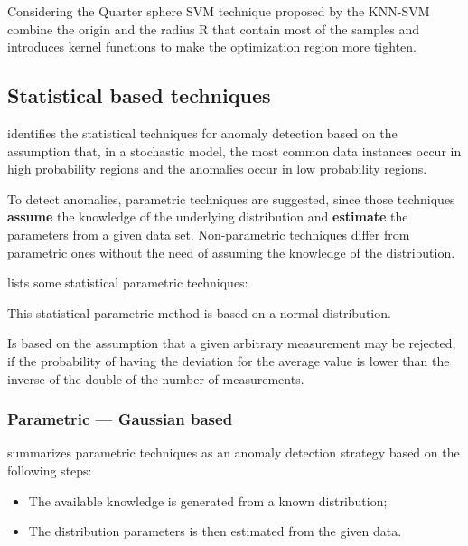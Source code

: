 Considering the Quarter sphere SVM technique proposed by \cite{class:rajasegarar:2007} the KNN-SVM combine the origin and the radius R that contain most of the samples and introduces kernel functions to make the optimization region more tighten. 

\subsection{Statistical based techniques}
\label{sec:statbased}



\cite{gen:chandola:2009} identifies the statistical techniques for anomaly detection based on the assumption that, in a stochastic model, the most common data instances occur in high probability regions and the anomalies occur in low probability regions.

To detect anomalies, parametric techniques are suggested, since those techniques \textbf{assume} the knowledge of the underlying distribution and \textbf{estimate} the parameters from a given data set. Non-parametric techniques differ from parametric ones without the need of assuming the knowledge of the distribution.

\cite{cluster:andrade2016} lists some statistical parametric techniques: 

\begin{description}
	\setlength\itemsep{-0.5em}
	\item[Peirce's Criterion]  
	This statistical parametric method is based on a normal distribution.
	\item[Chauvenet's Criterion]  
	Is based on the assumption that a given arbitrary measurement may be rejected, if the probability of having the deviation for the average value is lower than the inverse of the double of the number of measurements. 
	
\end{description}

\subsubsection{Parametric --- Gaussian based}
\cite{gen:zhang:2010} summarizes parametric techniques as an anomaly detection strategy based on the following steps:

\begin{itemize}
	\setlength\itemsep{-0.5em}
	\item The available knowledge is generated from a known distribution;
	\item The distribution parameters is then estimated from the given data.	
\end{itemize}

